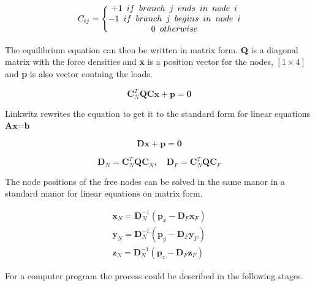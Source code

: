\begin{equation}
C_{ij} = \Bigg\{ \begin{matrix} 
+1\enskip if\enskip branch\enskip j\enskip ends\enskip in\enskip node\enskip i \\ 
-1\enskip if\enskip branch\enskip j\enskip begins\enskip in\enskip node\enskip i \\ 
0 \enskip otherwise  
\end{matrix}
\end{equation}

The equilibrium equation can then be written in matrix form. \textbf{Q} is a diagonal matrix with the force densities and \textbf{x} is a position vector for the nodes, $[1\times 4]$ and \textbf{p} is also vector containg the loads. 

\begin{equation}
 \textbf{C}^T_N\textbf{Q}\textbf{C}\textbf{x} + \textbf{p} = \textbf{0}
\end{equation}

Linkwitz rewrites the equation to get it to the standard form for linear equations $\textbf{Ax=b}$

\begin{equation}
 \textbf{Dx} + \textbf{p} = \textbf{0}
\end{equation}

\begin{equation}
\textbf{D}_N = \textbf{C}^T_N\textbf{Q}\textbf{C}_N,\quad \textbf{D}_F = \textbf{C}^T_N\textbf{Q}\textbf{C}_F 
\end{equation}

The node positions of the free nodes can be solved in the same manor in a standard manor for linear equations on matrix form.

\begin{align*} 
   \textbf{x}_N = \textbf{D}_N^{-1}(\textbf{p}_x - \textbf{D}_F\textbf{x}_F) \\ 
   \textbf{y}_N = \textbf{D}_N^{-1}(\textbf{p}_y - \textbf{D}_F\textbf{y}_F) \\ 
   \textbf{z}_N = \textbf{D}_N^{-1}(\textbf{p}_z - \textbf{D}_F\textbf{z}_F) 
\end{align*}

For a computer program the process could be described in the following stages.

